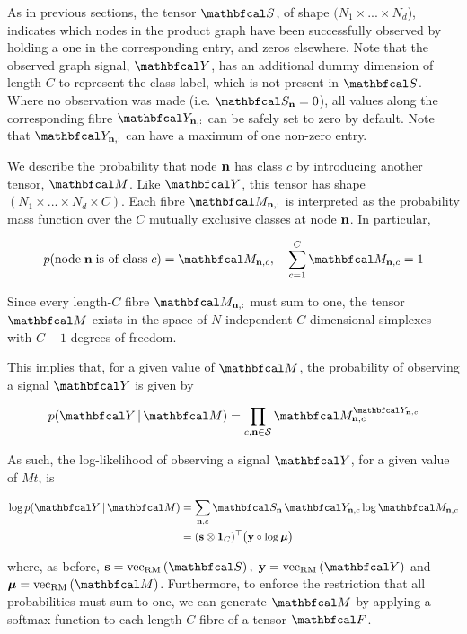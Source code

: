 As in previous sections, the tensor $\St$, of shape $(N_1 \times ... \times N_d$), indicates which nodes in the product graph have been successfully observed by holding a one in the corresponding entry, and zeros elsewhere. Note that the observed graph signal, $\Yt$, has an additional dummy dimension of length $C$ to represent the class label, which is not present in $\St$. Where no observation was made (i.e. $\St_{\nn} = 0$), all values along the corresponding fibre $\Yt_{\nn, :}$ can be safely set to zero by default. Note that $\Yt_{\nn, :}$ can have a maximum of one non-zero entry. 

We describe the probability that node $\mathbf{n}$ has class $c$ by introducing another tensor, $\Mt$. Like $\Yt$, this tensor has shape $(N_1 \times ... \times N_d \times C)$. Each fibre $\Mt_{\nn, :}$ is interpreted as the probability mass function over the $C$ mutually exclusive classes at node $\mathbf{n}$. In particular, 

\begin{equation*}
    p(\text{node} \; \nn \; \text{is of class} \; c) = \Mt_{\nn, c}, \quad \sum_{c=1}^C \Mt_{\nn, c} = 1
\end{equation*}

Since every length-$C$ fibre $\Mt_{\nn, :}$ must sum to one, the tensor $\Mt$ exists in the space of $N$ independent $C$-dimensional simplexes with $C-1$ degrees of freedom. 

This implies that, for a given value of $\Mt$, the probability of observing a signal $\Yt$ is given by

\begin{equation}
    p(\Yt \, | \, \Mt) = \prod_{c, \nn \in \mathcal{S}} \Mt_{\nn, c}^{\Yt_{\nn, c}}
\end{equation}

As such, the log-likelihood of observing a signal $\Yt$, for a given value of $Mt$, is

\begin{align}
    \log p(\Yt \, | \, \Mt) &= \sum_{\nn, c} \St_{\nn} \, \Yt_{\nn, c} \log \Mt_{\nn, c} \notag \\
    &= (\s \otimes \one_C)^\top \big(\y \circ \log \muu \big)
 \end{align}
 

where, as before, $\s = \vecrm{\St}, \; \y = \vecrm{\Yt}$ and $\muu = \vecrm{\Mt}$. Furthermore, to enforce the restriction that all probabilities must sum to one, we can generate $\Mt$ by applying a softmax function to each length-$C$ fibre of a tensor $\Ft$. 

